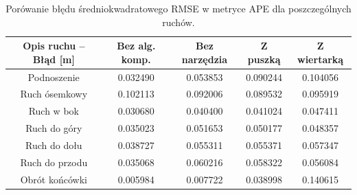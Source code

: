 {\small
\begin{table}[H]

	\begin{tabular}{||c | c c c c ||}

		\hline

		Opis ruchu --  Błąd [m]  &  Bez alg. komp. & Bez narzędzia & Z puszką  & Z wiertarką  \\ [0.5ex]

		\hline\hline

		Podnoszenie & 0.032490 & 0.053853 & 0.090244 & 0.104056 \\
		Ruch ósemkowy &0.102113  & 0.092006 & 0.089532 & 0.095919 \\
		Ruch w bok & 0.030680 & 0.040400 & 0.041024 &  0.047411\\
		Ruch do góry & 0.035023 & 0.051653 & 0.050177& 0.048357 \\
		Ruch do dołu & 0.038727 & 0.055311 & 0.055371 & 0.057347 \\
		Ruch do przodu & 0.035068 & 0.060216 & 0.058322 & 0.056084 \\
		Obrót końcówki & 0.005984 & 0.007722 & 0.038998 & 0.140615\\
		\hline

	\end{tabular}

	\caption{Porówanie błędu średniokwadratowego RMSE w metryce APE dla poszczególnych ruchów.}

	\label{tab:}

\end{table}
}